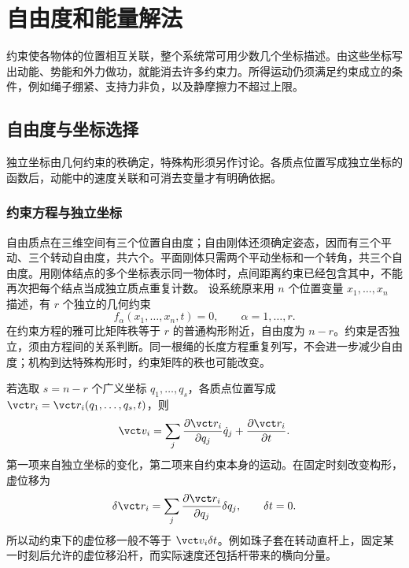 \documentclass[11pt,openany,fontset=fandol]{ctexbook}
\theoremstyle{definition}\newtheorem{example}{例}[chapter]\newtheorem{exercise}{习题}[chapter]
\begin{document}
\chapter{自由度和能量解法}

约束使各物体的位置相互关联，整个系统常可用少数几个坐标描述。由这些坐标写出动能、势能和外力做功，就能消去许多约束力。所得运动仍须满足约束成立的条件，例如绳子绷紧、支持力非负，以及静摩擦力不超过上限。


\section{自由度与坐标选择}
独立坐标由几何约束的秩确定，特殊构形须另作讨论。各质点位置写成独立坐标的函数后，动能中的速度关联和可消去变量才有明确依据。

\subsection{约束方程与独立坐标}
自由质点在三维空间有三个位置自由度；自由刚体还须确定姿态，因而有三个平动、三个转动自由度，共六个。平面刚体只需两个平动坐标和一个转角，共三个自由度。用刚体结点的多个坐标表示同一物体时，点间距离约束已经包含其中，不能再次把每个结点当成独立质点重复计数。
设系统原来用 $n$ 个位置变量 $x_1,\ldots,x_n$ 描述，有 $r$ 个独立的几何约束
\[
f_\alpha(x_1,\ldots,x_n,t)=0,\qquad \alpha=1,\ldots,r.
\]
在约束方程的雅可比矩阵秩等于 $r$ 的普通构形附近，自由度为 $n-r$。约束是否独立，须由方程间的关系判断。同一根绳的长度方程重复列写，不会进一步减少自由度；机构到达特殊构形时，约束矩阵的秩也可能改变。

若选取 $s=n-r$ 个广义坐标 $q_1,\ldots,q_s$，各质点位置写成 $\vct r_i=\vct r_i(q_1,\ldots,q_s,t)$，则
\begin{equation}\label{mp5:eq:l5-velocity}
\vct v_i=\sum_j\frac{\partial\vct r_i}{\partial q_j}\dot q_j+
\frac{\partial\vct r_i}{\partial t}.
\end{equation}
第一项来自独立坐标的变化，第二项来自约束本身的运动。在固定时刻改变构形，虚位移为
\begin{equation}\label{mp5:eq:l5-virtual}
\delta\vct r_i=\sum_j\frac{\partial\vct r_i}{\partial q_j}\delta q_j,
\qquad\delta t=0.
\end{equation}
所以动约束下的虚位移一般不等于 $\vct v_i\delta t$。例如珠子套在转动直杆上，固定某一时刻后允许的虚位移沿杆，而实际速度还包括杆带来的横向分量。
\end{document}
